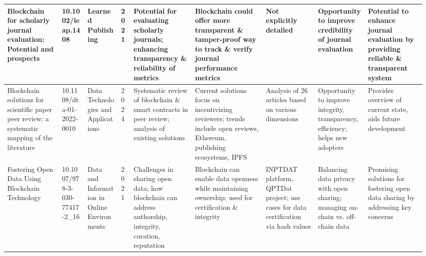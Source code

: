 \documentclass{article}
\begin{document}
\begin{landscape}
\begin{table}[ht]
\begin{tabularx}{\linewidth}{|p{3.5cm}|p{2.5cm}|p{3cm}|p{1.8cm}|X|X|X|X|X|}
            \hline
            Blockchain for scholarly journal evaluation: Potential and prospects                                                               & 10.1002/leap.1408             & Learned Publishing                                             & 2021                      & Potential for evaluating scholarly journals; enhancing transparency \& reliability of metrics                               & Blockchain could offer more transparent \& tamper-proof way to track \& verify journal performance metrics                                     & Not explicitly detailed                                                                                 & Opportunity to improve credibility of journal evaluation                                                                            & Potential to enhance journal evaluation by providing reliable \& transparent system                   \\
            \hline
            Blockchain solutions for scientific paper peer review: a systematic mapping of the literature                                      & 10.1108/dta-01-2022-0010      & Data Technologies and Applications                             & 2024                      & Systematic review of blockchain \& smart contracts in peer review; analysis of existing solutions                           & Current solutions focus on incentivizing reviewers; trends include open reviews, Ethereum, publishing ecosystems, IPFS                         & Analysis of 26 articles based on various dimensions                                                     & Opportunity to improve integrity, transparency, efficiency; helps new adopters                                                      & Provides overview of current state, aids future development                                           \\
            \hline
            Fostering Open Data Using Blockchain Technology                                                                                    & 10.1007/978-3-030-77417-2\_16 & Data and Information in Online Environments                    & 2021                      & Challenges in sharing open data; how blockchain can address authorship, integrity, curation, reputation                     & Blockchain can enable data openness while maintaining ownership; used for certification \& integrity                                           & INPTDAT platform, QPTDat project; use cases for data certification via hash values                      & Balancing data privacy with open sharing; managing on-chain vs. off-chain data                                                      & Promising solutions for fostering open data sharing by addressing key concerns                        \\

\end{tabularx}
\end{table}
\end{landscape}
\end{document}

